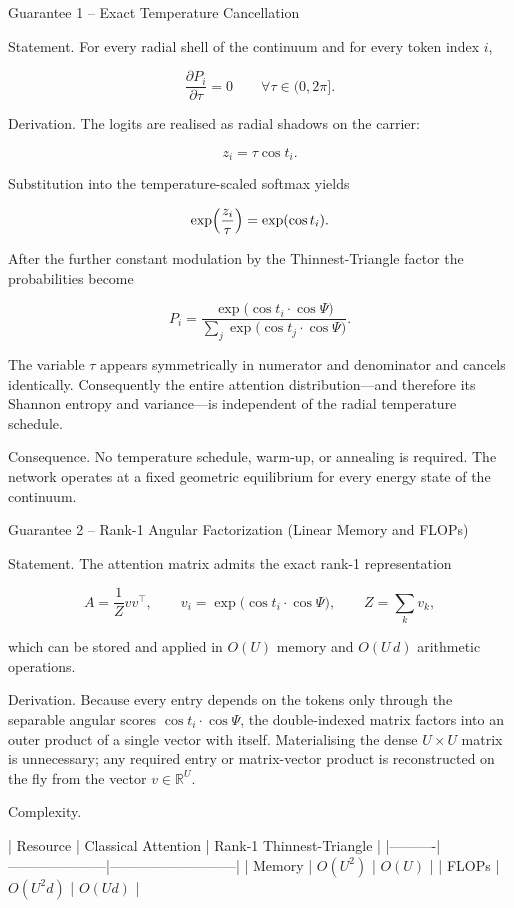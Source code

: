 Guarantee 1 – Exact Temperature Cancellation

Statement.  
For every radial shell of the continuum and for every token index \(i\),

\[
\frac{\partial P_i}{\partial\tau}=0\qquad\forall\tau\in(0,2\pi].
\]

Derivation.  
The logits are realised as radial shadows on the carrier:

\[
z_i=\tau\cos t_i.
\]

Substitution into the temperature-scaled softmax yields

\[
\exp\Bigl(\frac{z_i}{\tau}\Bigr)=\exp(\cos t_i).
\]

After the further constant modulation by the Thinnest-Triangle factor the probabilities become

\[
P_i=\frac{\exp\bigl(\cos t_i\cdot\cos\Psi\bigr)}{\sum_j\exp\bigl(\cos t_j\cdot\cos\Psi\bigr)}.
\]

The variable \(\tau\) appears symmetrically in numerator and denominator and cancels identically. Consequently the entire attention distribution—and therefore its Shannon entropy and variance—is independent of the radial temperature schedule.

Consequence.  
No temperature schedule, warm-up, or annealing is required. The network operates at a fixed geometric equilibrium for every energy state of the continuum.

Guarantee 2 – Rank-1 Angular Factorization (Linear Memory and FLOPs)

Statement.  
The attention matrix admits the exact rank-1 representation

\[
A=\frac{1}{Z}vv^\top,
\qquad
v_i=\exp\bigl(\cos t_i\cdot\cos\Psi\bigr),
\qquad
Z=\sum_k v_k,
\]

which can be stored and applied in \(O(U)\) memory and \(O(U\,d)\) arithmetic operations.

Derivation.  
Because every entry depends on the tokens only through the separable angular scores \(\cos t_i\cdot\cos\Psi\), the double-indexed matrix factors into an outer product of a single vector with itself. Materialising the dense \(U\times U\) matrix is unnecessary; any required entry or matrix-vector product is reconstructed on the fly from the vector \(v\in\mathbb{R}^U\).

Complexity.  

| Resource | Classical Attention | Rank-1 Thinnest-Triangle |
|----------|---------------------|---------------------------|
| Memory   | \(O(U^2)\)          | \(O(U)\)                  |
| FLOPs    | \(O(U^2 d)\)        | \(O(U d)\)                |

